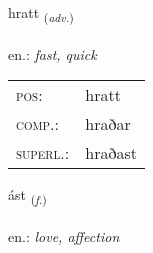 \documentclass[frontgrid, backgrid]{flacards}\usepackage[]{graphicx}\usepackage[]{xcolor}
\begin{document}
\renewcommand{\flhead}{\vskip5pt \fboxsep=0pt {\small\bfseries\footnotesize Atviksorð | Adverb}}
\renewcommand{\fcfoot}{\vskip5pt \fboxsep=0pt \hspace{2pt}{\small\bfseries\footnotesize 1K}}

\renewcommand{\blhead}{\vskip5pt {\small\bfseries\footnotesize Atviksorð | Adverb }}
\renewcommand{\bcfoot}{\vskip5pt \hspace{2pt}{\small\bfseries\footnotesize 1K}}


{hratt \small{\textsubscript{(\textit{adv.})}} \\[1ex] %
\textphonetic{[r̥aht]} \\
en.: \emph{fast, quick} \\  [2ex]
\renewcommand*{\arraystretch}{0.8}
\begin{tabular}{ll}
\textsc{pos}: & hratt \\ 
\textsc{comp.}: & hraðar \\ 
\textsc{superl.}: & hraðast \\
\end{tabular}
}

\renewcommand{\flhead}{\vskip5pt \fboxsep=0pt {\small\bfseries\footnotesize Nafnorð | Noun}}
\renewcommand{\fcfoot}{\vskip5pt \fboxsep=0pt \hspace{2pt}{\small\bfseries\footnotesize 1K}}

\renewcommand{\blhead}{\vskip5pt {\small\bfseries\footnotesize Nafnorð | Noun }}
\renewcommand{\bcfoot}{\vskip5pt \hspace{2pt}{\small\bfseries\footnotesize 1K}}


{ást \small{\textsubscript{(\textit{f.})}} \\[1ex] %
\textphonetic{[aust]} \\
en.: \emph{love, affection} \\  [2ex]
\renewcommand*{\arraystretch}{0.8}
}
\end{document}
